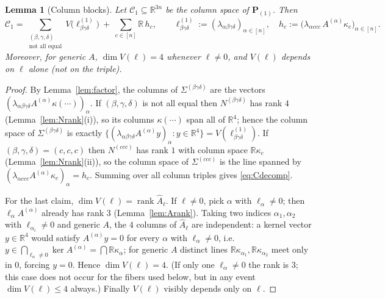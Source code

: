 \documentclass[12pt]{article}
\DeclareMathOperator{\rank}{rank}
\newcommand{\bR}{\mathbb{R}}
\newtheorem{lemma}{Lemma}
\theoremstyle{definition}
\begin{document}
\begin{lemma}[Column blocks]\label{lem:colblocks}
Let $\mathcal C_1\subseteq\bR^{3n}$ be the column space of $\mathbf P_{(1)}$.  Then
\begin{equation}\label{eq:Cdecomp}
\mathcal C_1=\sum_{\substack{(\beta,\gamma,\delta)\\ \text{not all equal}}}
V\bigl(\ell^{(1)}_{\beta\gamma\delta}\bigr)
\ +\ \sum_{c\in[n]}\bR\,h_c,
\qquad
\ell^{(1)}_{\beta\gamma\delta}:=(\lambda_{\alpha\beta\gamma\delta})_{\alpha\in[n]},
\quad
h_c:=\bigl(\lambda_{\alpha ccc}\,A^{(\alpha)}\kappa_c\bigr)_{\alpha\in[n]} .
\end{equation}
Moreover, for generic $A$, $\dim V(\ell)=4$ whenever $\ell\ne0$, and $V(\ell)$
depends on $\ell$ alone (not on the triple).
\end{lemma}

\begin{proof}
By Lemma~\ref{lem:factor}, the columns of $\Sigma^{(\beta\gamma\delta)}$ are the
vectors $(\lambda_{\alpha\beta\gamma\delta}A^{(\alpha)}\kappa(\cdots))_\alpha$.
If $(\beta,\gamma,\delta)$ is not all equal then $N^{(\beta\gamma\delta)}$ has rank
$4$ (Lemma~\ref{lem:Nrank}(i)), so its columns $\kappa(\cdots)$ span all of $\bR^4$;
hence the column space of $\Sigma^{(\beta\gamma\delta)}$ is exactly
$\{(\lambda_{\alpha\beta\gamma\delta}A^{(\alpha)}y)_\alpha:y\in\bR^4\}
=V(\ell^{(1)}_{\beta\gamma\delta})$.
If $(\beta,\gamma,\delta)=(c,c,c)$ then $N^{(ccc)}$ has rank $1$ with column space
$\bR\kappa_c$ (Lemma~\ref{lem:Nrank}(ii)), so the column space of
$\Sigma^{(ccc)}$ is the line spanned by
$(\lambda_{\alpha ccc}A^{(\alpha)}\kappa_c)_\alpha=h_c$.  Summing over all column
triples gives \eqref{eq:Cdecomp}.

For the last claim, $\dim V(\ell)=\rank\widehat A_\ell$.  If $\ell\ne0$, pick
$\alpha$ with $\ell_\alpha\ne0$; then $\ell_\alpha A^{(\alpha)}$ already has rank $3$
(Lemma~\ref{lem:Arank}).  Taking two indices $\alpha_1,\alpha_2$ with
$\ell_{\alpha_i}\ne0$ and generic $A$, the $4$ columns of $\widehat A_\ell$ are
independent: a kernel vector $y\in\bR^4$ would satisfy $A^{(\alpha)}y=0$ for every
$\alpha$ with $\ell_\alpha\ne0$, i.e.\ $y\in\bigcap_{\ell_\alpha\ne0}\ker A^{(\alpha)}
=\bigcap\bR\kappa_\alpha$; for generic $A$ distinct lines $\bR\kappa_{\alpha_1},
\bR\kappa_{\alpha_2}$ meet only in $0$, forcing $y=0$.  Hence $\dim V(\ell)=4$.
(If only one $\ell_\alpha\ne0$ the rank is $3$; this case does not occur for the
fibers used below, but in any event $\dim V(\ell)\le4$ always.)  Finally $V(\ell)$
visibly depends only on $\ell$.
\end{proof}
\end{document}
